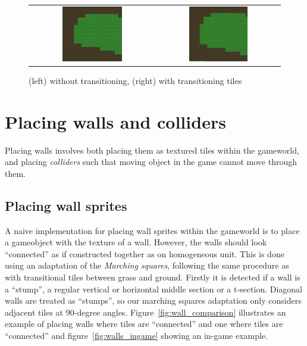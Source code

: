 \begin{figure}[H]
    \centering
    \begin{tabular}{cc}
        \includegraphics[width=0.5\textwidth]{figures/generating_levels/no_transition.png}
        &
        \includegraphics[width=0.5\textwidth]{figures/generating_levels/with_transition.png}
    \end{tabular}
    \caption{(left) without transitioning, (right) with transitioning tiles}\label{fig:transition_comparison}
\end{figure}

\section{Placing walls and colliders}
Placing walls involves both placing them as textured tiles within the
gameworld, and placing \textit{colliders} such that moving object in the game
cannot move through them.

\subsection{Placing wall sprites}
A naive implementation for placing wall sprites within the gameworld is to
place a gameobject with the texture of a wall. However, the walls should look
``connected'' as if constructed together as on homogeneous unit. This is done
using an adaptation of the \textit{Marching squares}, following the same
procedure as with transitional tiles between grass and ground. Firstly it is
detected if a wall is a ``stump'', a regular vertical or horizontal middle
section or a t-section.  Diagonal walls are treated as ``stumps'', so our
marching squares adaptation only considers adjacent tiles at 90-degree angles.
Figure~\ref{fig:wall_comparison} illustrates an example of placing walls where
tiles are ``connected'' and one where tiles are ``connected'' and
figure~\ref{fig:walls_ingame} showing an in-game example.

